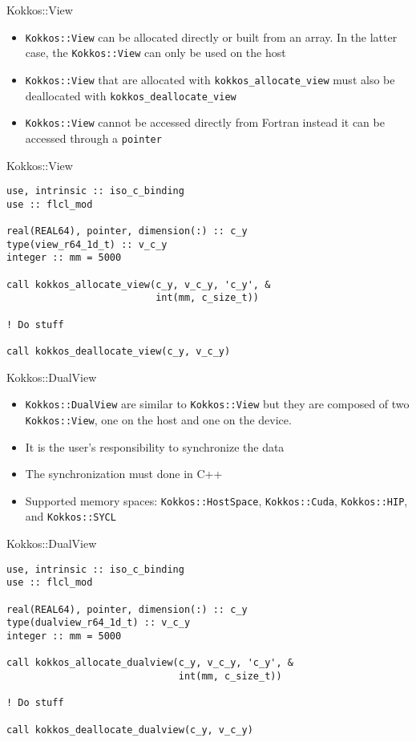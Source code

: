 \begin{frame}{Kokkos::View}
  \begin{itemize}
    \item \texttt{Kokkos::View} can be allocated directly or built from an
      array. In the latter case, the \texttt{Kokkos::View} can only be used on
      the host %
    \item \texttt{Kokkos::View} that are allocated with
      \texttt{kokkos\_allocate\_view} must also be deallocated with
      \texttt{kokkos\_deallocate\_view}
    \item \texttt{Kokkos::View} cannot be accessed directly from Fortran instead
      it can be accessed through a \texttt{pointer}
  \end{itemize}
\end{frame}

\begin{frame}[containsverbatim]{Kokkos::View}
  \begin{verbatim}
use, intrinsic :: iso_c_binding
use :: flcl_mod

real(REAL64), pointer, dimension(:) :: c_y
type(view_r64_1d_t) :: v_c_y
integer :: mm = 5000

call kokkos_allocate_view(c_y, v_c_y, 'c_y', &
                          int(mm, c_size_t))

! Do stuff

call kokkos_deallocate_view(c_y, v_c_y)
  \end{verbatim}
\end{frame}

\begin{frame}{Kokkos::DualView}
  \begin{itemize}
    \item \texttt{Kokkos::DualView} are similar to \texttt{Kokkos::View} but
      they are composed of two \texttt{Kokkos::View}, one on the host and one on
      the device.
    \item It is the user's responsibility to synchronize the data
    \item The synchronization must done in C++
    \item Supported memory spaces: \texttt{Kokkos::HostSpace},
      \texttt{Kokkos::Cuda}, \texttt{Kokkos::HIP}, and \texttt{Kokkos::SYCL}
  \end{itemize}
\end{frame}

\begin{frame}[containsverbatim]{Kokkos::DualView}
  \begin{verbatim}
use, intrinsic :: iso_c_binding
use :: flcl_mod

real(REAL64), pointer, dimension(:) :: c_y
type(dualview_r64_1d_t) :: v_c_y
integer :: mm = 5000

call kokkos_allocate_dualview(c_y, v_c_y, 'c_y', &
                              int(mm, c_size_t))

! Do stuff

call kokkos_deallocate_dualview(c_y, v_c_y)
  \end{verbatim}
\end{frame}


